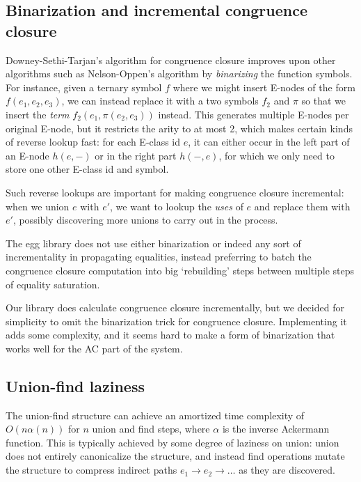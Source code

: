 \documentclass[12pt,a4paper,twoside,openright]{report}
\numberwithin{equation}{chapter}		%
\numberwithin{figure}{chapter}			%
\numberwithin{table}{chapter}			%
\theoremstyle{definition}
\theoremstyle{plain}
\begin{document}
\subsection{Binarization and incremental congruence closure}
Downey-Sethi-Tarjan's algorithm for congruence closure \citep{downey_variations_1980} improves upon other algorithms such as Nelson-Oppen's algorithm \citep{nelson_fast_1980} by \emph{binarizing} the function symbols. For instance, given a ternary symbol $f$ where we might insert E-nodes of the form $f(e_1, e_2, e_3)$, we can instead replace it with a two symbols $f_2$ and $\pi$ so that we insert the \emph{term} $f_2(e_1, \pi(e_2, e_3))$ instead. This generates multiple E-nodes per original E-node, but it restricts the arity to at most 2, which makes certain kinds of reverse lookup fast: for each E-class id $e$, it can either occur in the left part of an E-node $h(e, -)$ or in the right part $h(-, e)$, for which we only need to store one other E-class id and symbol.

Such reverse lookups are important for making congruence closure incremental: when we union $e$ with $e'$, we want to lookup the \emph{uses} of $e$ and replace them with $e'$, possibly discovering more unions to carry out in the process.

The egg library \citep{willsey_egg_2021} does not use either binarization or indeed any sort of incrementality in propagating equalities, instead preferring to batch the congruence closure computation into big `rebuilding' steps between multiple steps of equality saturation.

Our library does calculate congruence closure incrementally, but we decided for simplicity to omit the binarization trick for congruence closure. Implementing it adds some complexity, and it seems hard to make a form of binarization that works well for the AC part of the system.

\subsection{Union-find laziness}
The union-find structure can achieve an amortized time complexity of $O(n \alpha(n))$ for $n$ union and find steps, where $\alpha$ is the inverse Ackermann function. This is typically achieved by some degree of laziness on union: union does not entirely canonicalize the structure, and instead find operations mutate the structure to compress indirect paths $e_1 \rightarrow e_2 \rightarrow \ldots$ as they are discovered.
\end{document}
